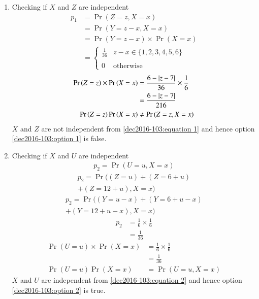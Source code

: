 \begin{enumerate}
    
\item Checking if $X$ and $Z$ are independent
\begin{align}
    p_1 &= \Pr{(Z=z, X=x)}
    \\ &= \Pr{(Y=z-x, X=x)}
    \\ &= \Pr{(Y=z-x)} \times \Pr{(X=x)}
    \\ &= \begin{cases}
        \frac{1}{36} & z-x \in \{1, 2, 3, 4, 5, 6\}\\ ~\\[-1em]
        0 & \text{otherwise}
    \end{cases}
\end{align}
\begin{align}
    \Pr{(Z=z)}\times \Pr{(X=x)} &= \frac{6 - \left\vert z-7\right\vert}{36} \times \frac{1}{6}
    \\&= \frac{6 - \left\vert z-7\right\vert}{216}
    \\\Pr{(Z=z)}\Pr{(X=x)} &\neq \Pr{(Z=z, X=x)}  \label{dec2016-103:equation 1}
\end{align}
$X$ and $Z$ are not independent from \eqref{dec2016-103:equation 1} and hence option \eqref{dec2016-103:option 1} is false.
\item Checking if $X$ and $U$ are independent
\begin{align}
    p_2 = \Pr{(U=u, X=x)}
\end{align}
\begin{multline}
    p_2 = \Pr{((Z=u) + (Z=6+u)}
    \\+ (Z=12+u), X=x)
\end{multline}
\begin{multline}
    p_2 = \Pr{((Y=u-x) + (Y=6+u-x)}
    \\+ (Y=12+u-x), X=x)
\end{multline}
\begin{align}
    p_2 &= \frac{1}{6} \times \frac{1}{6}
    \\&= \frac{1}{36}
\end{align}
\begin{align}
    \Pr{(U=u)}\times \Pr{(X=x)} &= \frac{1}{6} \times \frac{1}{6}
    \\&= \frac{1}{36}
    \\\Pr{(U=u)}\Pr{(X=x)} &= \Pr{(U=u, X=x)}  \label{dec2016-103:equation 2}
\end{align}
$X$ and $U$ are independent from \eqref{dec2016-103:equation 2} and hence option \eqref{dec2016-103:option 2} is true.

\end{enumerate}
